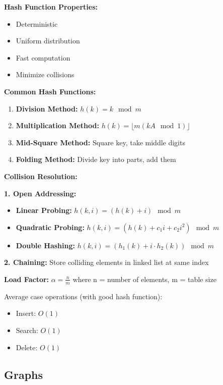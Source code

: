 \documentclass[11pt,a4paper]{article}
\begin{document}
\textbf{Hash Function Properties:}
\begin{itemize}
    \item Deterministic
    \item Uniform distribution
    \item Fast computation
    \item Minimize collisions
\end{itemize}

\textbf{Common Hash Functions:}
\begin{enumerate}
    \item \textbf{Division Method:} $h(k) = k \mod m$
    \item \textbf{Multiplication Method:} $h(k) = \lfloor m(kA \mod 1) \rfloor$
    \item \textbf{Mid-Square Method:} Square key, take middle digits
    \item \textbf{Folding Method:} Divide key into parts, add them
\end{enumerate}

\textbf{Collision Resolution:}

\textbf{1. Open Addressing:}
\begin{itemize}
    \item \textbf{Linear Probing:} $h(k, i) = (h(k) + i) \mod m$
    \item \textbf{Quadratic Probing:} $h(k, i) = (h(k) + c_1i + c_2i^2) \mod m$
    \item \textbf{Double Hashing:} $h(k, i) = (h_1(k) + i \cdot h_2(k)) \mod m$
\end{itemize}

\textbf{2. Chaining:} Store colliding elements in linked list at same index

\textbf{Load Factor:} $\alpha = \frac{n}{m}$ where n = number of elements, m = table size

\begin{notebox}
Average case operations (with good hash function):
\begin{itemize}
    \item Insert: $O(1)$
    \item Search: $O(1)$
    \item Delete: $O(1)$
\end{itemize}
\end{notebox}

\subsection{Graphs}
\end{document}
